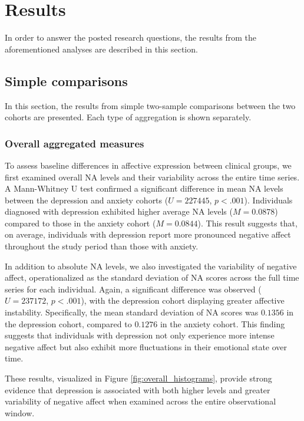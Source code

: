 \section{Results}
\label{sec:results}

In order to answer the posted research questions, the results from the aforementioned analyses are described in this section.

\subsection{Simple comparisons}

In this section, the results from simple two-sample comparisons between the two cohorts are presented. Each type of aggregation is shown separately.

\subsubsection{Overall aggregated measures}

To assess baseline differences in affective expression between clinical groups, we first examined overall NA levels and their variability across the entire time series. A Mann-Whitney U test confirmed a significant difference in mean NA levels between the depression and anxiety cohorts ($U = 227445$, $p < .001$). Individuals diagnosed with depression exhibited higher average NA levels ($M = 0.0878$) compared to those in the anxiety cohort ($M = 0.0844$). This result suggests that, on average, individuals with depression report more pronounced negative affect throughout the study period than those with anxiety.

In addition to absolute NA levels, we also investigated the variability of negative affect, operationalized as the standard deviation of NA scores across the full time series for each individual. Again, a significant difference was observed ($U = 237172$, $p < .001$), with the depression cohort displaying greater affective instability. Specifically, the mean standard deviation of NA scores was $0.1356$ in the depression cohort, compared to $0.1276$ in the anxiety cohort. This finding suggests that individuals with depression not only experience more intense negative affect but also exhibit more fluctuations in their emotional state over time.

These results, visualized in Figure \ref{fig:overall_histograms}, provide strong evidence that depression is associated with both higher levels and greater variability of negative affect when examined across the entire observational window. 



